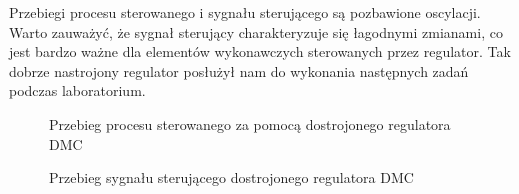 \indent Przebiegi procesu sterowanego i sygnału sterującego są pozbawione oscylacji. 
Warto zauważyć, że sygnał sterujący charakteryzuje się łagodnymi zmianami, 
co jest bardzo ważne dla elementów wykonawczych sterowanych przez regulator. 
Tak dobrze nastrojony regulator posłużył nam do wykonania następnych 
zadań podczas laboratorium. 
\begin{figure}[t]
    
    \centering
    \caption{Przebieg procesu sterowanego za pomocą dostrojonego regulatora DMC}
    \label{lab_zad4_lab_proces_wykres}
\end{figure}

\begin{figure}[b]
    
    \centering
    \caption{Przebieg sygnału sterującego dostrojonego regulatora DMC}
    \label{lab_zad4_lab_ster}
\end{figure}
\FloatBarrier
\fi 




